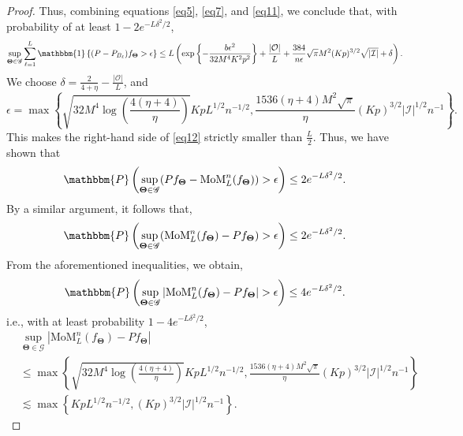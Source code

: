 \documentclass{article}
\newcommand{\bTheta}{\boldsymbol{\Theta}}
\newcommand{\I}{\mathcal{I}}
\newcommand{\cO}{\mathcal{O}}
\newcommand{\sP}{\mathbbm{P}}
\newcommand{\one}{\mathbbm{1}}
\begin{document}
\begin{proof}
Thus, combining equations \eqref{eq5}, \eqref{eq7}, and \eqref{eq11}, we conclude that,  with probability of at least $1-2e^{-L \delta^2/2}$, 
\begin{equation}
    \sup_{\bTheta \in \mathscr{G}}\sum_{\ell = 1}^L \one\left\{(P-P_{B_\ell})f_{\bTheta} > \epsilon\right\} \le  L \left( \exp\left\{-\frac{b \epsilon^2}{32  M^4 K^2 p^2}\right\}+ \frac{|\cO|}{L} + \frac{384}{n \epsilon}  \sqrt{\pi} M^2  (Kp)^{3/2} \sqrt{|\I|} + \delta\right). \label{eq12}
\end{equation}
We choose $\delta = \frac{2}{4+\eta} - \frac{|\cO|}{L}$, and $$\epsilon = \max\left\{\sqrt{32  M^4 \log\left(\frac{4(\eta+4)}{\eta}\right)}KpL^{1/2}n^{-1/2}, \frac{1536(\eta+4)  M^2 \sqrt{\pi}}{\eta} (Kp)^{3/2} |\I|^{1/2}n^{-1}\right\}.$$ This makes the right-hand side of \eqref{eq12} strictly smaller than $\frac{L}{2}$.
Thus, we have shown that 
\begin{align*}
     \sP\left( \sup_{\bTheta \in \mathscr{G}} (Pf_{\bTheta} - \text{MoM}^n_L (f_{\bTheta}))> \epsilon \right) \le 2e^{-L \delta^2/2}.
 \end{align*}
By a similar argument, it follows that,
\begin{align*}
    \sP\left( \sup_{\bTheta \in \mathscr{G}} (\text{MoM}^n_L (f_{\bTheta}) -Pf_{\bTheta} ) > \epsilon \right) \le 2e^{-L \delta^2/2}.
\end{align*}
From the aforementioned inequalities, we obtain, 
\[\sP\left( \sup_{\bTheta \in \mathscr{G}} |\text{MoM}^n_L (f_{\bTheta}) -Pf_{\bTheta} | > \epsilon \right) \le 4e^{-L \delta^2/2}.\]
i.e., with at least probability $1-4e^{-L \delta^2/2}$,
\begin{align*}
    & \sup_{\bTheta \in \mathscr{G}} |\text{MoM}^n_L (f_{\bTheta}) -Pf_{\bTheta} | \\
    &\le \max\left\{\sqrt{32  M^4 \log\left(\frac{4(\eta+4)}{\eta}\right)}KpL^{1/2}n^{-1/2}, \frac{1536(\eta+4)  M^2 \sqrt{\pi}}{\eta} (Kp)^{3/2} |\I|^{1/2}n^{-1}\right\}\\
    &\lesssim \max\left\{ KpL^{1/2}n^{-1/2}, (Kp)^{3/2}  |\I|^{1/2}n^{-1}\right\}.
\end{align*}
\end{proof}
\end{document}
